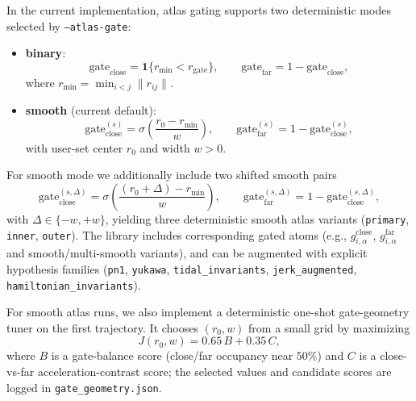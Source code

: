 \documentclass[11pt]{article}
\begin{document}
In the current implementation, atlas gating supports two deterministic modes selected by \texttt{--atlas-gate}:
\begin{itemize}
\item \textbf{binary}:
\begin{equation*}
\mathrm{gate}_{\mathrm{close}}=\mathbf{1}\{r_{\min}<r_{\mathrm{gate}}\},\qquad
\mathrm{gate}_{\mathrm{far}}=1-\mathrm{gate}_{\mathrm{close}},
\end{equation*}
where $r_{\min}=\min_{i<j}\|r_{ij}\|$.
\item \textbf{smooth} (current default):
\begin{equation*}
\mathrm{gate}^{(s)}_{\mathrm{close}}=\sigma\!\left(\frac{r_0-r_{\min}}{w}\right),\qquad
\mathrm{gate}^{(s)}_{\mathrm{far}}=1-\mathrm{gate}^{(s)}_{\mathrm{close}},
\end{equation*}
with user-set center $r_0$ and width $w>0$.
\end{itemize}
For smooth mode we additionally include two shifted smooth pairs
\begin{equation*}
\mathrm{gate}^{(s,\Delta)}_{\mathrm{close}}=\sigma\!\left(\frac{(r_0+\Delta)-r_{\min}}{w}\right),\qquad
\mathrm{gate}^{(s,\Delta)}_{\mathrm{far}}=1-\mathrm{gate}^{(s,\Delta)}_{\mathrm{close}},
\end{equation*}
with $\Delta\in\{-w,+w\}$, yielding three deterministic smooth atlas variants (\texttt{primary}, \texttt{inner}, \texttt{outer}).
The library includes corresponding gated atoms (e.g., $g^{\mathrm{close}}_{i,\alpha}$, $g^{\mathrm{far}}_{i,\alpha}$ and smooth/multi-smooth variants), and can be augmented with explicit hypothesis families (\texttt{pn1}, \texttt{yukawa}, \texttt{tidal\_invariants}, \texttt{jerk\_augmented}, \texttt{hamiltonian\_invariants}).

For smooth atlas runs, we also implement a deterministic one-shot gate-geometry tuner on the first trajectory. It chooses $(r_0,w)$ from a small grid by maximizing
\begin{equation*}
J(r_0,w)=0.65\,B+0.35\,C,
\end{equation*}
where $B$ is a gate-balance score (close/far occupancy near $50\%$) and $C$ is a close-vs-far acceleration-contrast score; the selected values and candidate scores are logged in \texttt{gate\_geometry.json}.
\end{document}
